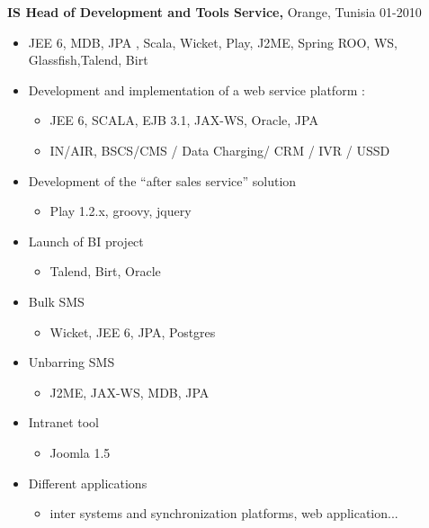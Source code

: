 \documentclass{res}
\begin{document}
\begin{resume}
{\bf IS Head of Development and Tools Service,} Orange, Tunisia \hfill   01-2010
\begin{itemize} \itemsep -2pt  %

\item JEE 6, MDB, JPA , Scala, Wicket, Play, J2ME, Spring ROO, WS, Glassfish,Talend, Birt

\item Development and implementation of a web service platform :
\begin{itemize} \itemsep -2pt  %
\item JEE 6, SCALA, EJB 3.1, JAX-WS, Oracle, JPA
\item IN/AIR, BSCS/CMS / Data Charging/ CRM / IVR /  USSD
\end{itemize}
\item Development of the “after sales service” solution
 \begin{itemize} \itemsep -2pt  %
 \item Play 1.2.x, groovy, jquery
\end{itemize}
\item Launch of BI project
\begin{itemize} \itemsep -2pt  %
 \item Talend, Birt, Oracle
\end{itemize}
\item Bulk SMS
\begin{itemize} \itemsep -2pt  %
\item Wicket, JEE 6, JPA, Postgres
\end{itemize}
\item Unbarring SMS
 \begin{itemize} \itemsep -2pt  %
\item J2ME, JAX-WS, MDB, JPA
\end{itemize}
\item Intranet tool
\begin{itemize} \itemsep -2pt  %
\item Joomla 1.5
\end{itemize}
\item Different applications
\begin{itemize}  \itemsep -2pt  %
\item inter systems and synchronization platforms, web application...
\end{itemize}
\end{itemize}


\end{resume}
\end{document}
